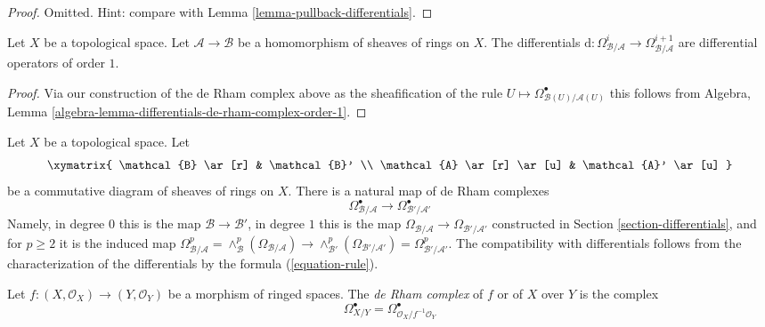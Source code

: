\begin{proof}
Omitted. Hint: compare with Lemma \ref{lemma-pullback-differentials}.
\end{proof}

\begin{lemma}
\label{lemma-differentials-de-rham-complex-order-1}
Let $X$ be a topological space. Let $\mathcal{A} \to \mathcal{B}$
be a homomorphism of sheaves of rings on $X$. The differentials
$\text{d} : \Omega^i_{\mathcal{B}/\mathcal{A}}  \to
\Omega^{i + 1}_{\mathcal{B}/\mathcal{A}}$
are differential operators of order $1$.
\end{lemma}

\begin{proof}
Via our construction of the de Rham complex above as the sheafification
of the rule  $U \mapsto \Omega^\bullet_{\mathcal{B}(U)/\mathcal{A}(U)}$
this follows from
Algebra, Lemma \ref{algebra-lemma-differentials-de-rham-complex-order-1}.
\end{proof}

\noindent
Let $X$ be a topological space. Let
$$
\xymatrix{
\mathcal{B} \ar[r] & \mathcal{B}' \\
\mathcal{A} \ar[r] \ar[u] & \mathcal{A}' \ar[u]
}
$$
be a commutative diagram of sheaves of rings on $X$.
There is a natural map of de Rham complexes
$$
\Omega^\bullet_{\mathcal{B}/\mathcal{A}} \longrightarrow
\Omega^\bullet_{\mathcal{B}'/\mathcal{A}'}
$$
Namely, in degree $0$ this is the map $\mathcal{B} \to \mathcal{B}'$,
in degree $1$ this is the map
$\Omega_{\mathcal{B}/\mathcal{A}} \to \Omega_{\mathcal{B}'/\mathcal{A}'}$
constructed in Section \ref{section-differentials}, and for $p \geq 2$
it is the induced map
$\Omega^p_{\mathcal{B}/\mathcal{A}} =
\wedge^p_\mathcal{B}(\Omega_{\mathcal{B}/\mathcal{A}}) \to
\wedge^p_{\mathcal{B}'}(\Omega_{\mathcal{B}'/\mathcal{A}'}) =
\Omega^p_{\mathcal{B}'/\mathcal{A}'}$.
The compatibility with differentials follows from the characterization
of the differentials by the formula (\ref{equation-rule}).

\begin{definition}
\label{definition-de-rham-complex-morphism-ringed-spaces}
Let $f : (X, \mathcal{O}_X) \to (Y, \mathcal{O}_Y)$ be a morphism
of ringed spaces. The {\it de Rham complex} of $f$ or of $X$ over $Y$
is the complex
$$
\Omega^\bullet_{X/Y} = \Omega^\bullet_{\mathcal{O}_X/f^{-1}\mathcal{O}_Y}
$$
\end{definition}

